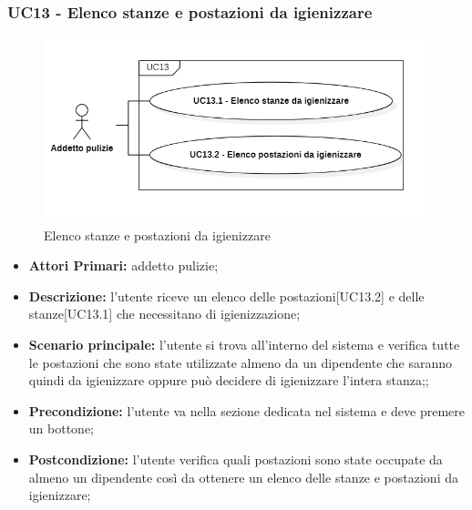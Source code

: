 \subsubsection{ UC13 - Elenco stanze e postazioni da igienizzare}
\begin{figure}[H]
		\centering
		\includegraphics[width=15cm]{res/images/UC13.png}
		\caption{Elenco stanze e postazioni da igienizzare}
		\label{fig:Elenco stanze e postazioni da igienizzare}
	\end{figure}
\begin{itemize}
           	\item\textbf{Attori Primari:} addetto pulizie;
           	\item\textbf{Descrizione:} l'utente riceve un elenco delle postazioni[UC13.2] e delle stanze[UC13.1] che necessitano di igienizzazione;
           	\item\textbf{Scenario principale:} l'utente si trova all'interno del sistema e verifica tutte le postazioni che sono state utilizzate almeno da un dipendente che saranno quindi da igienizzare oppure può decidere di igienizzare l’intera stanza;;
           	\item\textbf{Precondizione:} l'utente va nella sezione dedicata nel sistema e deve premere un bottone;
           	\item\textbf{Postcondizione:} l'utente verifica quali postazioni sono state occupate da almeno un dipendente così da ottenere un elenco delle stanze e postazioni da igienizzare;
\end{itemize}

